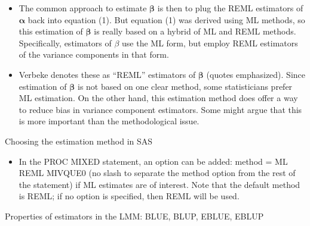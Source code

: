 \documentclass[
  9pt,
  ignorenonframetext,
]{beamer}
\providecommand{\tightlist}{%
  \setlength{\itemsep}{0pt}\setlength{\parskip}{0pt}}
\begin{document}
\begin{frame}{}
\protect\hypertarget{section-10}{}
\begin{itemize}
\item
  The common approach to estimate \(\pmb \beta\) is then to plug the
  REML estimators of \(\pmb \alpha\) back into equation (1). But
  equation (1) was derived using ML methods, so this estimation of
  \(\pmb \beta\) is really based on a hybrid of ML and REML methods.
  Specifically, estimators of \(\beta\) use the ML form, but employ REML
  estimators of the variance components in that form.
\item
  Verbeke denotes these as ``REML'' estimators of \(\pmb \beta\) (quotes
  emphasized). Since estimation of \(\pmb \beta\) is not based on one
  clear method, some statisticians prefer ML estimation. On the other
  hand, this estimation method does offer a way to reduce bias in
  variance component estimators. Some might argue that this is more
  important than the methodological issue.
\end{itemize}

\begin{block}{Choosing the estimation method in SAS}
\protect\hypertarget{choosing-the-estimation-method-in-sas}{}
\begin{itemize}
\tightlist
\item
  In the PROC MIXED statement, an option can be added: method = ML REML
  MIVQUE0 (no slash to separate the method option from the rest of the
  statement) if ML estimates are of interest. Note that the default
  method is REML; if no option is specified, then REML will be used.
\end{itemize}

Properties of estimators in the LMM: BLUE, BLUP, EBLUE, EBLUP
\end{block}
\end{frame}
\end{document}
